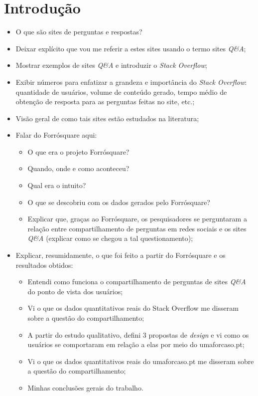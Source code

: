 \chapter{Introdução}
    \begin{itemize}
        \item O que são sites de perguntas e respostas?
        \item Deixar explícito que vou me referir a estes sites usando o termo sites \textit{Q\&A};
        \item Mostrar exemplos de sites \textit{Q\&A} e introduzir o \textit{Stack Overflow};
        \item Exibir números para enfatizar a grandeza e importância do \textit{Stack Overflow}: quantidade de usuários, volume de conteúdo gerado, tempo médio de obtenção de resposta para as perguntas feitas no site, etc.; 
        \item Visão geral de como tais sites estão estudados na literatura;
        \item Falar do Forrósquare aqui:
            \begin{itemize}
                \item O que era o projeto Forrósquare?
                \item Quando, onde e como aconteceu?
                \item Qual era o intuito?
                \item O que se descobriu com os dados gerados pelo Forrósquare?
                \item Explicar que, graças ao Forrósquare, os pesquisadores se perguntaram a relação entre compartilhamento de perguntas em redes sociais e os sites \textit{Q\&A} (explicar como se chegou a tal questionamento);
            \end{itemize}
        \item Explicar, resumidamente, o que foi feito a partir do Forrósquare e os resultados obtidos:
            \begin{itemize}
                \item Entendi como funciona o compartilhamento de perguntas de sites \textit{Q\&A} do ponto de vista dos usuários;
                \item Vi o que os dados quantitativos reais do Stack Overflow me disseram sobre a questão do compartilhamento;
                \item A partir do estudo qualitativo, defini 3 propostas de \textit{design} e vi como os usuários se comportaram em relação a elas por meio do umaforcaso.pt;
                \item Vi o que os dados quantitativos reais do umaforcaso.pt me disseram sobre a questão do compartilhamento;
                \item Minhas conclusões gerais do trabalho.
            \end{itemize}
\end{itemize}

